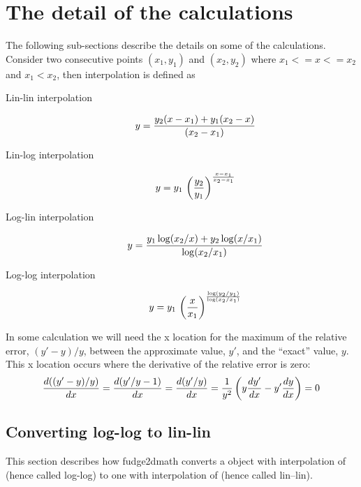 \section{The detail of the calculations}
The following sub-sections describe the details on some of the calculations. 
Consider two consecutive points $(x_1,y_1)$ and $(x_2,y_2)$ where $x_1 <= x <= x_2$ and $x_1 < x_2$, then interpolation is defined as

\begin{description}
    \item[Lin-lin interpolation] 
    \begin{equation}
        y = { y_2 ( x - x_1 ) + y_1 ( x_2 - x ) \over ( x_2 - x_1 ) }
    \end{equation}
    \item[Lin-log interpolation] 
    \begin{equation}
        y = y_1 \, \left( y_2 \over y_1 \right)^{x - x_1 \over x_2 - x_1}
    \end{equation}
    \item[Log-lin interpolation] 
    \begin{equation}
        y = { y_1 \log(x_2/x) + y_2 \log(x/x_1) \over \log(x_2/x_1) }
    \end{equation}
    \item[Log-log interpolation] 
    \begin{equation}
        y = y_1 \, \left( x \over x_1 \right)^{\log(y_2/y_1) \over \log(x_2/x_1)}
    \end{equation}
\end{description}

In some calculation we will need the x location for the maximum of the relative error, $( y' - y ) / y$, between the 
approximate value, $y'$, and the ``exact'' value, 
$y$. This x location occurs where the derivative of the relative error is zero:
\begin{equation}    \label{MaxXFormula}
    { d(( y' - y ) / y ) \over dx} = { d(y'/y - 1) \over dx} = {d(y'/y) \over dx} = { 1 \over y^2 } \left( y {dy' \over dx } - y' { dy \over dx } \right) = 0
\end{equation}


\subsection{Converting log-log to lin-lin}
This section describes how fudge2dmath converts a  object with interpolation of
 (hence called log-log) to one with interpolation of 
(hence called lin--lin).

